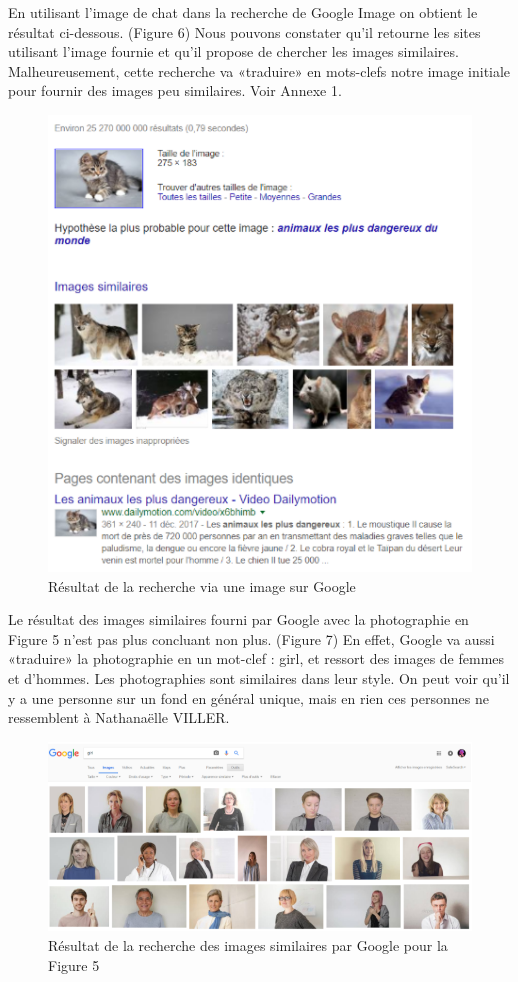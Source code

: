 \documentclass[a4paper,12pt]{article}
\begin{document}
En utilisant l'image de chat dans la recherche de Google Image on obtient le résultat ci-dessous. (Figure 6) Nous pouvons constater qu'il retourne les sites utilisant l'image fournie et qu'il propose de chercher les images similaires.  Malheureusement, cette recherche va «traduire» en mots-clefs notre image initiale pour fournir des images peu similaires. Voir Annexe 1. \\ 

    \begin{figure}[!ht]
    \centering
        \includegraphics[scale=1]{images/ResGI.PNG}
        \caption{Résultat de la recherche via une image sur Google}
    \end{figure}

Le résultat des images similaires fourni par Google avec la photographie en Figure 5 n'est pas plus concluant non plus. (Figure 7) En effet, Google va aussi «traduire» la photographie en un mot-clef : girl, et ressort des images de femmes et d'hommes. Les photographies sont similaires dans leur style. On peut voir qu'il y a une personne sur un fond en général unique, mais en rien ces personnes ne ressemblent à Nathanaëlle VILLER.
    \begin{figure}[!ht]
    \centering
        \includegraphics[scale=0.7]{images/Res3GI.PNG}
        \caption{Résultat de la recherche des images similaires par Google pour la Figure 5}
    \end{figure}
    
\end{document}
